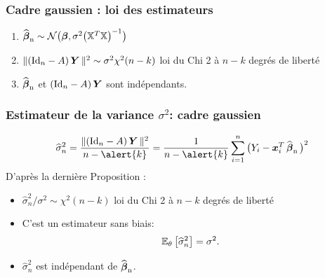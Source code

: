 \begin{frame}
\frametitle{Cadre gaussien : loi des estimateurs}
\begin{prop}
\begin{enumerate}
\item  \alert<1>{$\operatorname{\widehat{\boldsymbol{\beta}}_n} \sim {\mathcal N}\big(\boldsymbol{\beta}, \sigma^2 \big(\mathbb{X}^T\mathbb{X}\big)^{-1}\big)$}
\item  \alert<2>{$\|(\mathrm{Id}_{n} - A) \operatorname{\boldsymbol{Y}} \|^2 \sim
\sigma^2\chi^2(n-k)$ loi du Chi 2 à $n-k$ degrés de liberté}
\item  \alert<3>{$\operatorname{\widehat{\boldsymbol{\beta}}_n}$ et $(\mathrm{Id}_{n} - A) \operatorname{\boldsymbol{Y}}$ sont indépendants}.
\end{enumerate}
\end{prop}
\end{frame}




\begin{frame}
\frametitle{Estimateur de la variance $\sigma^2$: cadre gaussien}
$$
\widehat \sigma_n^2 = \frac{\| (\Id{n}-\projX) \bY \|^2}{n-\alert{k}} = \frac{1}{n-\alert{k}}\sum_{i = 1}^n\big(Y_i-\bx_i^T \estregress \big)^2
$$
D'après la dernière Proposition :
\begin{itemize}
\item $\widehat
\sigma_n^2/\sigma^2 \sim \chi^2(n-k)$ \alert{ loi du Chi 2 à
$n-k$ degrés de liberté}
\item C'est un estimateur \alert{sans biais}: $$\operatorname{{\mathbb E}}_\theta\big[\widehat
\sigma_n^2\big]=\sigma^2.$$
\item $\widehat \sigma_n^2$ est \alert{indépendant} de $\operatorname{\widehat{\boldsymbol{\beta}}_n}$.
\end{itemize}
\end{frame}

